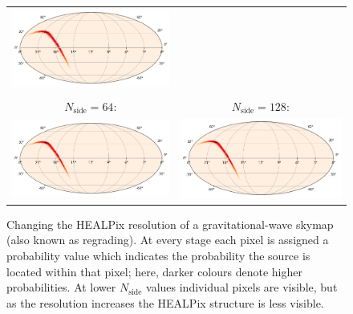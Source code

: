 \begin{colsection}
\begin{figure}[p]
\begin{center}
\begin{tabular}{cc}
            \includegraphics[width=0.45\linewidth]{images/regrade/32.png} \\
            \\
            $N_\text{side} = 64$: &
            $N_\text{side} = 128$: \\
            \includegraphics[width=0.45\linewidth]{images/regrade/64.png} &
            \includegraphics[width=0.45\linewidth]{images/regrade/128.png} \\
        \end{tabular}
    \end{center}
    \caption[Regrading a gravitational-wave skymap]{
        Changing the HEALPix resolution of a gravitational-wave skymap (also known as regrading). At every stage each pixel is assigned a probability value which indicates the probability the source is located within that pixel; here, darker colours denote higher probabilities. At lower $N_\text{side}$ values individual pixels are visible, but as the resolution increases the HEALPix structure is less visible.
    }\label{fig:skymap_regrade}
\end{figure}


\end{colsection}
